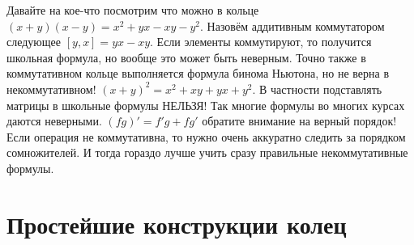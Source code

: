 Давайте на кое-что посмотрим что можно в кольце $(x+y)(x-y)=x^2+yx-xy-y^2$.
Назовём аддитивным коммутатором следующее $[y,x]=yx-xy$. Если элементы
коммутируют, то получится школьная формула, но вообще это может быть неверным.
Точно также в коммутативном кольце выполняется формула бинома Ньютона, но не
верна в некоммутативном! $(x+y)^2=x^2+xy+yx+y^2$. В частности подставлять
матрицы в школьные формулы НЕЛЬЗЯ! Так многие формулы во многих курсах даются
неверными. $(fg)'=f'g+fg'$ обратите внимание на верный порядок! Если операция
не коммутативна, то нужно очень аккуратно следить за порядком сомножителей. И
тогда гораздо лучше учить сразу правильные некоммутативные формулы.

\section{Простейшие конструкции колец}

